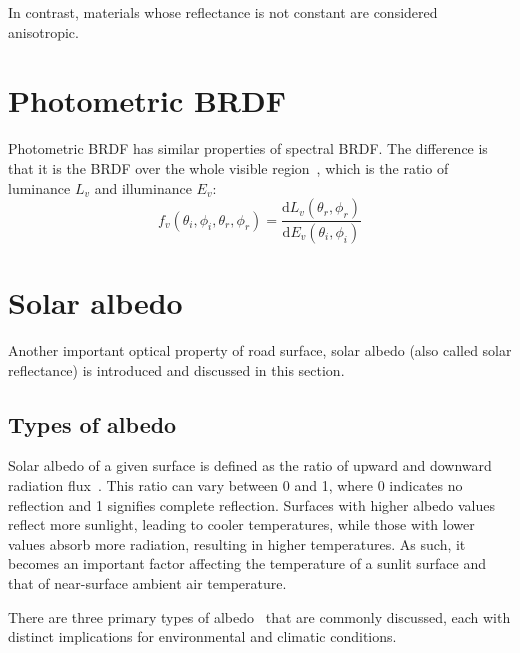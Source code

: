 In contrast, materials whose reflectance is not constant are considered anisotropic.


\section{Photometric BRDF}

Photometric BRDF has similar properties of spectral BRDF. 
The difference is that it is the BRDF over the whole visible region~\cite{2022_Hebert}, which is the ratio of luminance $L_v$ and illuminance $E_v$:
\begin{equation}
\label{eq:brdf_definition_photometric}
    f_v(\theta_i, \phi_i, \theta_r, \phi_r) = \frac{\mathrm{d}{L_v(\theta_r, \phi_r)}}{\mathrm{d}E_v(\theta_i, \phi_i)}%
\end{equation}



\section{Solar albedo}

Another important optical property of road surface, solar albedo (also called solar reflectance) is introduced and discussed in this section.


\subsection{Types of albedo}

Solar albedo of a given surface is defined as the ratio of upward and downward radiation flux~\cite{2015_Qu,2019_Chen}.
This ratio can vary between 0 and 1, where 0 indicates no reflection and 1 signifies complete reflection.
Surfaces with higher albedo values reflect more sunlight, leading to cooler temperatures, while those with lower values absorb more radiation, resulting in higher temperatures.
As such, it becomes an important factor affecting the temperature of a sunlit surface and that of near-surface ambient air temperature.

There are three primary types of albedo~\cite{2015_Qu} that are commonly discussed, each with distinct implications for environmental and climatic conditions.

